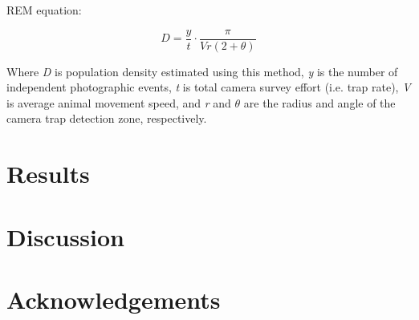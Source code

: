 \documentclass[11pt]{article}
\begin{document}
	
	REM equation:
	
		\begin{equation}
			D = \frac{y}{t} \cdot \frac{\pi}{Vr(2 + \theta)}
	\end{equation}
	
	Where \textit{D} is population density estimated using this method, \textit{y} is the number of independent photographic events, \textit{t} is total camera survey effort (i.e. trap rate), \textit{V} is average animal movement speed, and \textit{r} and \begin{math}\theta\end{math} are the radius and angle of the camera trap detection zone, respectively. 
	
	
	
	
	
	
	
	
	
	
	
	
	\section{Results}
	
	
	
	\newpage
	
	\section{Discussion}
	
	
	

	\section{Acknowledgements}

	
	
	
\end{document}
